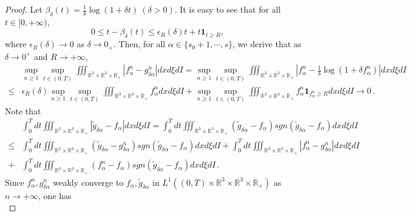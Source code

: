 \documentclass[reqno,11pt]{amsart}
\numberwithin{equation}{section}
\def\R{\mathbb{R}}
\begin{document}
\begin{proof}
	Let $\beta_\delta (t)=\frac{1}{\delta} \log (1+\delta t) \ (\delta >0)$. It is easy to see that for all $t\in [0,+\infty)$,
	\begin{equation*}
		0 \leq t-\beta_\delta (t) \leq \epsilon_R (\delta) t + t \mathbf{1}_{t\geq R},
	\end{equation*}
	where $\epsilon_R(\delta )\rightarrow 0$ as $\delta \rightarrow 0_+.$ 
Then, for all $\alpha \in \{s_0+1,\cdots,s\}$, we derive that as $\delta \rightarrow 0^+$ and $R \rightarrow +\infty$,
\begin{equation*}
	\begin{aligned}
		&\sup \limits_{n \geq 1} \sup \limits_{t\in (0,T)} \iiint_{\R^3 \times \R^3 \times \R_+ } |f^n_\alpha -g^n_{\delta \alpha} |dxd\xi dI = \sup \limits_{n \geq 1} \sup \limits_{t\in (0,T)} \iiint_{\R^3 \times \R^3 \times \R_+ } |f^n_\alpha -\tfrac{1}{\delta} \log (1+\delta f^n_\alpha)|dxd\xi dI \\
		\leq & \epsilon_R(\delta ) \sup \limits_{n \geq 1} \sup \limits_{t\in (0,T)} \iiint_{\R^3 \times \R^3 \times \R_+ }f^n_\alpha dxd\xi dI + \sup \limits_{n \geq 1} \sup \limits_{t\in (0,T)} \iiint_{\R^3 \times \R^3 \times \R_+ } f^n_\alpha \mathbf{1}_{f^n_\alpha \geq R}dxd\xi dI \to 0 \,.
	\end{aligned}
\end{equation*}
Note that
\begin{equation*}
	\begin{aligned}
		&\int_0^T dt \iiint_{\R^3 \times \R^3 \times \R_+} | \tilde{g}_{\delta \alpha}-f_\alpha |dxd\xi dI = \int_0^T dt \iiint_{\R^3 \times \R^3 \times \R_+} ( \tilde{g}_{\delta \alpha}-f_\alpha ) sgn(\tilde{g}_{\delta \alpha}-f_\alpha) dxd\xi dI \\
		\leq & \int_0^T dt \iiint_{\R^3 \times \R^3 \times \R_+} (\tilde{g}_{\delta \alpha} - g^n_{\delta \alpha} ) sgn(\tilde{g}_{\delta \alpha}-f_\alpha) dxd\xi dI +\int_0^T dt \iiint_{\R^3 \times \R^3 \times \R_+} |f^n_\alpha -g^n_{\delta \alpha} |dxd\xi dI\\
		+& \int_0^T dt \iiint_{\R^3 \times \R^3 \times \R_+} (f^n_\alpha -f_\alpha) sgn(\tilde{g}_{\delta \alpha}-f_\alpha) dxd\xi dI \,.
	\end{aligned}
\end{equation*}
Since $f^n_\alpha, g^n_{\delta \alpha}$ weakly converge to $f_\alpha, \tilde{g}_{\delta \alpha}$ in $L^1 ( (0, T) \times \R^3 \times \R^3 \times \R_+ )$ as $n \to + \infty$, one has
\begin{equation*}

\end{equation*}
\end{proof}
\end{document}
